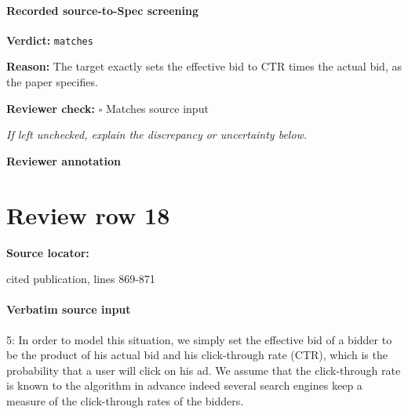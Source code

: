 \documentclass[10pt]{article}
\newcommand{\reviewerbox}{%
  \par\noindent\fbox{\parbox{0.96\linewidth}{\rule{0pt}{0.38in}}}\par
}
\newcommand{\reviewmatch}[1]{%
  \par\noindent\textbf{Reviewer check:} $\square$\; #1\par
  \noindent\emph{If left unchecked, explain the discrepancy or uncertainty below.}\par
}
\begin{document}
\paragraph{Recorded source-to-Spec screening}
\textbf{Verdict:} \texttt{matches}
\\
{\raggedright
\textbf{Reason:} The target exactly sets the effective bid to CTR times the actual bid, as the paper specifies.\allowbreak{}
\par}
\reviewmatch{Matches source input}
\noindent\textbf{Reviewer annotation}\par
\reviewerbox
\clearpage
\hypertarget{source-claim-4b491badf63e7c26}{}
\section*{Review row 18}
\textbf{Source locator:} {\footnotesize\raggedright cited publication, lines 869-\allowbreak{}871\par}
\paragraph{Verbatim source input}
\begin{ReviewVerbatim}
5: In order to model this situation, we simply set the effective bid of a bidder to be the product
of his actual bid and his click-through rate (CTR), which is the probability that a user will
click on his ad. We assume that the click-through rate is known to the algorithm in advance indeed several search engines keep a measure of the click-through rates of the bidders.
\end{ReviewVerbatim}
\end{document}
